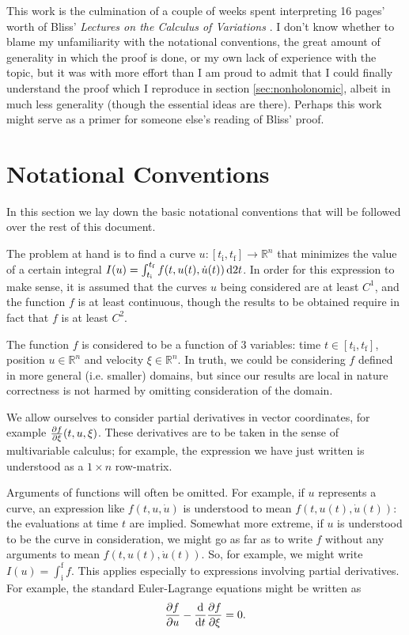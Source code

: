 \documentclass{article}
\theoremstyle{plain}
\theoremstyle{plain}
\theoremstyle{nonumberplain}
\theoremstyle{empty}
\newcommand{\R}{\mathbb{R}}
\newcommand{\tstart}{\mathrm{i}}
\newcommand{\tend}{\mathrm{f}}
\begin{document}
This work is the culmination of a couple of weeks spent interpreting 16 pages' worth of Bliss' \textit{Lectures on the Calculus of Variations} \cite[pp.~187-202]{bliss}. I don't know whether to blame my unfamiliarity with the notational conventions, the great amount of generality in which the proof is done, or my own lack of experience with the topic, but it was with more effort than I am proud to admit that I could finally understand the proof which I reproduce in section \ref{sec:nonholonomic}, albeit in much less generality (though the essential ideas are there). Perhaps this work might serve as a primer for someone else's reading of Bliss' proof.

\section{Notational Conventions}

In this section we lay down the basic notational conventions that will be followed over the rest of this document.

The problem at hand is to find a curve $u \colon [t_\tstart, t_\tend] \to \R^n$ that minimizes the value of a certain integral $I(u) = \int_{t_\tstart}^{t_\tend} f(t, u(t), \dot u(t)) \dl2 t$. In order for this expression to make sense, it is assumed that the curves $u$ being considered are at least $C^1$, and the function $f$ is at least continuous, though the results to be obtained require in fact that $f$ is at least $C^2$.

The function $f$ is considered to be a function of 3 variables: time $t \in [t_\tstart, t_\tend]$, position $u \in \R^n$ and velocity $\xi \in \R^n$. In truth, we could be considering $f$ defined in more general (i.e. smaller) domains, but since our results are local in nature correctness is not harmed by omitting consideration of the domain.

We allow ourselves to consider partial derivatives in vector coordinates, for example $\diffp f \xi (t, u, \xi)$. These derivatives are to be taken in the sense of multivariable calculus; for example, the expression we have just written is understood as a $1 \times n$ row-matrix.

Arguments of functions will often be omitted. For example, if $u$ represents a curve, an expression like $f(t,u,\dot u)$ is understood to mean $f(t,u(t),\dot u(t))$: the evaluations at time $t$ are implied. Somewhat more extreme, if $u$ is understood to be the curve in consideration, we might go as far as to write $f$ without any arguments to mean $f(t,u(t),\dot u(t))$. So, for example, we might write $I(u) = \int_\tstart^\tend f$. This applies especially to expressions involving partial derivatives. For example, the standard Euler-Lagrange equations might be written as
\[\diffp f u - \diff*{\diffp f \xi}t = 0.\]
\end{document}

